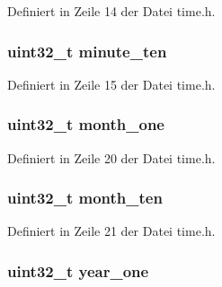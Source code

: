 Definiert in Zeile 14 der Datei time.\+h.

\hypertarget{structtime__date_a2659c12e8307db4c98ce9cb1bf53bc0e}{}
\subsubsection[{minute\+\_\+ten}]{\setlength{\rightskip}{0pt plus 5cm}uint32\+\_\+t minute\+\_\+ten}\label{structtime__date_a2659c12e8307db4c98ce9cb1bf53bc0e}


Definiert in Zeile 15 der Datei time.\+h.

\hypertarget{structtime__date_a6ad3129035cd14cf22da6e4a1fecf018}{}
\subsubsection[{month\+\_\+one}]{\setlength{\rightskip}{0pt plus 5cm}uint32\+\_\+t month\+\_\+one}\label{structtime__date_a6ad3129035cd14cf22da6e4a1fecf018}


Definiert in Zeile 20 der Datei time.\+h.

\hypertarget{structtime__date_afadd8a2137e5a4d272d63e02386c2bd8}{}
\subsubsection[{month\+\_\+ten}]{\setlength{\rightskip}{0pt plus 5cm}uint32\+\_\+t month\+\_\+ten}\label{structtime__date_afadd8a2137e5a4d272d63e02386c2bd8}


Definiert in Zeile 21 der Datei time.\+h.

\hypertarget{structtime__date_a55217c761921c4b4443fb1d4dee3f564}{}
\subsubsection[{year\+\_\+one}]{\setlength{\rightskip}{0pt plus 5cm}uint32\+\_\+t year\+\_\+one}\label{structtime__date_a55217c761921c4b4443fb1d4dee3f564}


